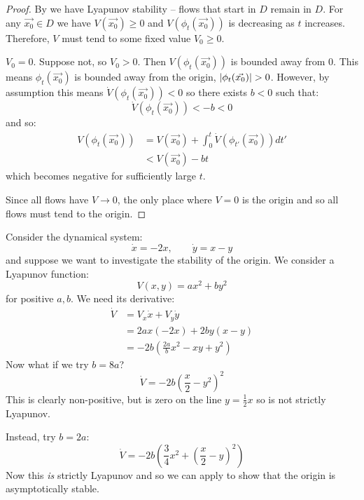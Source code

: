 \documentclass[../Main.tex]{subfiles}
\begin{document}
\begin{proof}
    By  we have Lyapunov stability -- flows that start in $D$ remain in $D$. For any $\vec{x_0} \in D$ we have $V(\vec{x_0}) \geq 0$ and $V(\phi_t(\vec{x_0}))$ is decreasing as $t$ increases. Therefore, $V$ must tend to some fixed value $V_0 \geq 0$.
    \begin{subproof}{$V_0 = 0$.}
        Suppose not, so $V_0 > 0$. Then $V(\phi_t(\vec{x_0}))$ is bounded away from $0$. This means $\phi_t(\vec{x_0})$ is bounded away from the origin, $\left|\phi_t(\vec{x_0})\right| > 0$. However, by assumption this means $\dot{V}(\phi_t(\vec{x_0})) < 0$ so there exists $b < 0$ such that:
        \begin{equation*}
            \dot{V}(\phi_t(\vec{x_0})) < -b < 0
        \end{equation*}
        and so:
        \begin{align*}
            V(\phi_t(\vec{x_0})) &= V(\vec{x_0}) + \int_{0}^{t} \dot{V}(\phi_{t'}(\vec{x_0})) dt'  \\
            &< V(\vec{x_0}) - bt
        \end{align*}
        which becomes negative for sufficiently large $t$. \contradiction
    \end{subproof}
    Since all flows have $V \to 0$, the only place where $V = 0$ is the origin and so all flows must tend to the origin.
\end{proof}
\begin{example}
    Consider the dynamical system:
    \begin{equation*}
        \dot{x} = -2x,\qquad \dot{y} = x - y
    \end{equation*}
    and suppose we want to investigate the stability of the origin. We consider a Lyapunov function:
    \begin{equation*}
        V(x, y) = ax^2 + by^2
    \end{equation*}
    for positive $a, b$. We need its derivative:
    \begin{align*}
        \dot{V} &= V_x \dot{x} + V_y \dot{y} \\
        &= 2ax(-2x) + 2by(x-y) \\
        &= -2b \left(\frac{2a}{b}x^2 - xy + y^2\right)
    \end{align*}
    Now what if we try $b = 8a$?
    \begin{equation*}
        \dot{V} = -2b\left(\frac{x}{2} - y^2\right)^2
    \end{equation*}
    This is clearly non-positive, but is zero on the line $y = \frac12x$ so is not strictly Lyapunov.

    Instead, try $b = 2a$:
    \begin{equation*}
        \dot{V} = -2b\left(\frac34x^2 + \left(\frac{x}{2} - y\right)^2\right)
    \end{equation*}
    Now this \textit{is} strictly Lyapunov and so we can apply  to show that the origin is asymptotically stable.
\end{example}
\end{document}
